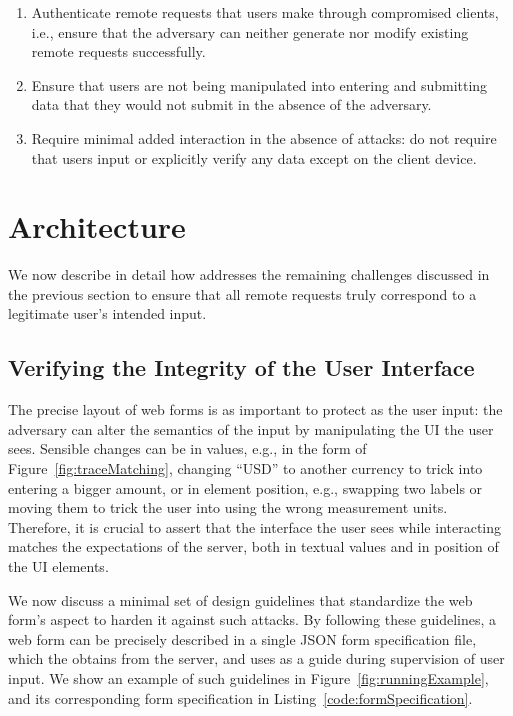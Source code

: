 \begin{enumerate}[leftmargin=*]
	\item Authenticate remote requests that users make through compromised clients, i.e., ensure that the adversary can neither generate nor modify existing remote requests successfully.

	\item Ensure that users are not being manipulated into entering and submitting data that they would not submit in the absence of the adversary.

	\item Require minimal added interaction in the absence of attacks: do not require that users input or explicitly verify any data except on the client device.
\end{enumerate}


\section{\sysname Architecture} \label{sec:hardenUI}

We now describe in detail how \sysname addresses the remaining challenges discussed in the previous section to ensure that all remote requests truly correspond to a legitimate user's intended input.


\subsection{Verifying the Integrity of the User Interface}
\label{sec:systemDesign:webpage}

The precise layout of web forms is as important to protect as the user input: the adversary can alter the semantics of the input by manipulating the UI the user sees.
Sensible changes can be in values, e.g., in the form of Figure~\ref{fig:traceMatching}, changing ``USD'' to another currency to trick into entering a bigger amount, or in element position, e.g., swapping two labels or moving them to trick the user into using the wrong measurement units.
Therefore, it is crucial to assert that the interface the user sees while interacting matches the expectations of the server, both in textual values and in position of the UI elements.

We now discuss a minimal set of design guidelines that standardize the web form's aspect to harden it against such attacks.
By following these guidelines, a web form can be precisely described in a single JSON form specification file, which the \app obtains from the server, and uses as a guide during supervision of user input.
We show an example of such guidelines in Figure~\ref{fig:runningExample}, and its corresponding form specification in Listing~\ref{code:formSpecification}.


